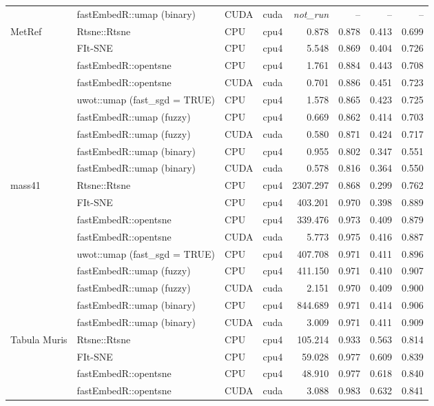 {\begin{longtable}{p{}p{}llrrrr}
 & fastEmbedR::umap (binary) & CUDA & cuda & \textit{not\_run} & -- & -- & --\\
\addlinespace[2pt]
MetRef & Rtsne::Rtsne & CPU & cpu4 & 0.878 & 0.878 & 0.413 & 0.699\\
 & FIt-SNE & CPU & cpu4 & 5.548 & 0.869 & 0.404 & 0.726\\
 & fastEmbedR::opentsne & CPU & cpu4 & 1.761 & 0.884 & 0.443 & 0.708\\
 & fastEmbedR::opentsne & CUDA & cuda & 0.701 & 0.886 & 0.451 & 0.723\\
 & uwot::umap (fast\_sgd = TRUE) & CPU & cpu4 & 1.578 & 0.865 & 0.423 & 0.725\\
 & fastEmbedR::umap (fuzzy) & CPU & cpu4 & 0.669 & 0.862 & 0.414 & 0.703\\
 & fastEmbedR::umap (fuzzy) & CUDA & cuda & 0.580 & 0.871 & 0.424 & 0.717\\
 & fastEmbedR::umap (binary) & CPU & cpu4 & 0.955 & 0.802 & 0.347 & 0.551\\
 & fastEmbedR::umap (binary) & CUDA & cuda & 0.578 & 0.816 & 0.364 & 0.550\\
\addlinespace[2pt]
mass41 & Rtsne::Rtsne & CPU & cpu4 & 2307.297 & 0.868 & 0.299 & 0.762\\
 & FIt-SNE & CPU & cpu4 & 403.201 & 0.970 & 0.398 & 0.889\\
 & fastEmbedR::opentsne & CPU & cpu4 & 339.476 & 0.973 & 0.409 & 0.879\\
 & fastEmbedR::opentsne & CUDA & cuda & 5.773 & 0.975 & 0.416 & 0.887\\
 & uwot::umap (fast\_sgd = TRUE) & CPU & cpu4 & 407.708 & 0.971 & 0.411 & 0.896\\
 & fastEmbedR::umap (fuzzy) & CPU & cpu4 & 411.150 & 0.971 & 0.410 & 0.907\\
 & fastEmbedR::umap (fuzzy) & CUDA & cuda & 2.151 & 0.970 & 0.409 & 0.900\\
 & fastEmbedR::umap (binary) & CPU & cpu4 & 844.689 & 0.971 & 0.414 & 0.906\\
 & fastEmbedR::umap (binary) & CUDA & cuda & 3.009 & 0.971 & 0.411 & 0.909\\
\addlinespace[2pt]
Tabula Muris & Rtsne::Rtsne & CPU & cpu4 & 105.214 & 0.933 & 0.563 & 0.814\\
 & FIt-SNE & CPU & cpu4 & 59.028 & 0.977 & 0.609 & 0.839\\
 & fastEmbedR::opentsne & CPU & cpu4 & 48.910 & 0.977 & 0.618 & 0.840\\
 & fastEmbedR::opentsne & CUDA & cuda & 3.088 & 0.983 & 0.632 & 0.841\\

\end{longtable}}
